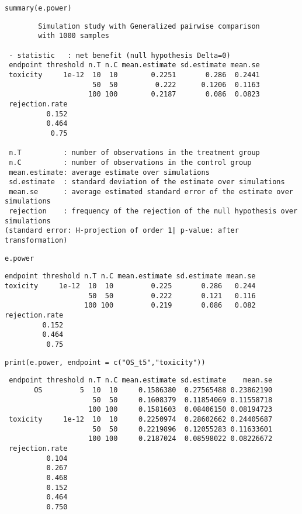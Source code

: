 \documentclass[12pt]{article}
\begin{document}
\lstset{language=r,label= ,caption= ,captionpos=b,numbers=none}
\begin{lstlisting}
summary(e.power)
\end{lstlisting}

\begin{verbatim}
        Simulation study with Generalized pairwise comparison
        with 1000 samples

 - statistic   : net benefit (null hypothesis Delta=0)
 endpoint threshold n.T n.C mean.estimate sd.estimate mean.se
 toxicity     1e-12  10  10        0.2251       0.286  0.2441
                     50  50         0.222      0.1206  0.1163
                    100 100        0.2187       0.086  0.0823
 rejection.rate
          0.152
          0.464
           0.75

 n.T          : number of observations in the treatment group
 n.C          : number of observations in the control group
 mean.estimate: average estimate over simulations
 sd.estimate  : standard deviation of the estimate over simulations
 mean.se      : average estimated standard error of the estimate over simulations
 rejection    : frequency of the rejection of the null hypothesis over simulations
(standard error: H-projection of order 1| p-value: after transformation)
\end{verbatim}
\lstset{language=r,label= ,caption= ,captionpos=b,numbers=none}
\begin{lstlisting}
e.power
\end{lstlisting}

\begin{verbatim}
endpoint threshold n.T n.C mean.estimate sd.estimate mean.se
toxicity     1e-12  10  10         0.225       0.286   0.244
                    50  50         0.222       0.121   0.116
                   100 100         0.219       0.086   0.082
rejection.rate
         0.152
         0.464
          0.75
\end{verbatim}



\lstset{language=r,label= ,caption= ,captionpos=b,numbers=none}
\begin{lstlisting}
print(e.power, endpoint = c("OS_t5","toxicity"))
\end{lstlisting}

\begin{verbatim}
 endpoint threshold n.T n.C mean.estimate sd.estimate    mean.se
       OS         5  10  10     0.1586380  0.27565488 0.23862190
                     50  50     0.1608379  0.11854069 0.11558718
                    100 100     0.1581603  0.08406150 0.08194723
 toxicity     1e-12  10  10     0.2250974  0.28602662 0.24405687
                     50  50     0.2219896  0.12055283 0.11633601
                    100 100     0.2187024  0.08598022 0.08226672
 rejection.rate
          0.104
          0.267
          0.468
          0.152
          0.464
          0.750
\end{verbatim}
\end{document}
